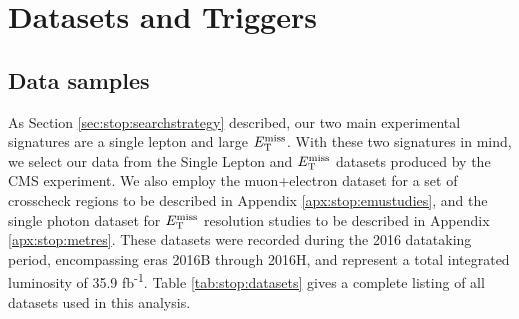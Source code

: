 \section{Datasets and Triggers}
\label{sec:stop:datatrig}

\subsection{Data samples}
\label{ssec:stop:datasamples}

As Section \ref{sec:stop:searchstrategy} described, our two main
experimental signatures are a single lepton and large $E_\text{T}^\text{miss}$.
With these two signatures in mind, we select our data from the
Single Lepton and $E_\text{T}^\text{miss}$ datasets produced by the CMS
experiment. We also employ the muon+electron dataset for a set of crosscheck
regions to be described in Appendix \ref{apx:stop:emustudies}, and the
single photon dataset for $E_\text{T}^\text{miss}$ resolution studies to be
described in Appendix \ref{apx:stop:metres}. These datasets were recorded during the
2016 datataking period, encompassing eras 2016B through 2016H, and
represent a total integrated luminosity of 35.9 fb\textsuperscript{-1}. Table
\ref{tab:stop:datasets} gives a complete listing of all datasets used
in this analysis.

